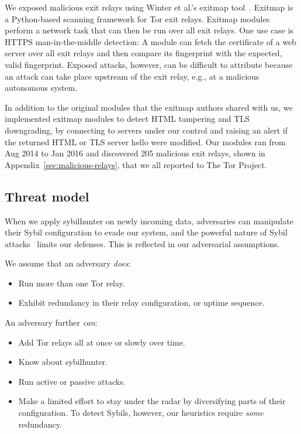 We exposed malicious exit relays using Winter et al.'s exitmap tool~\cite[\S
3.1]{Winter2014a}.  Exitmap is a Python-based scanning framework for Tor exit
relays.  Exitmap modules perform a network task that can then be run over all
exit relays.  One use case is HTTPS man-in-the-middle detection: A module can
fetch the certificate of a web server over all exit relays and then compare its
fingerprint with the expected, valid fingerprint.  Exposed attacks, however, can
be difficult to attribute because an attack can take place upstream of the exit
relay, e.g., at a malicious autonomous system.

In addition to the original modules that the exitmap authors shared with us, we
implemented exitmap modules to detect HTML tampering and TLS downgrading, by
connecting to servers under our control and raising an alert if the returned
HTML or TLS server hello were modified.  Our modules ran from Aug 2014 to Jan
2016 and discovered 205 malicious exit relays, shown in
Appendix~\ref{sec:malicious-relays}, that we all reported to The Tor Project.

\subsection{Threat model}
\label{sec:threat_model}
When we apply sybilhunter on newly incoming data, adversaries can manipulate
their Sybil configuration to evade our system, and the powerful nature of Sybil
attacks~\cite{Douceur2002a} limits our defenses.  This is reflected in our
adversarial assumptions.

We assume that an adversary \emph{does}:
\begin{itemize}
	\item Run more than one Tor relay.

	\item Exhibit redundancy in their relay configuration, or uptime sequence.
\end{itemize}

An adversary further \emph{can}:
\begin{itemize}
	\item Add Tor relays all at once or slowly over time.

	\item Know about sybilhunter.

	\item Run active or passive attacks.

	\item Make a limited effort to stay under the radar by diversifying parts of
		their configuration.  To detect Sybils, however, our heuristics require
		\emph{some} redundancy.
\end{itemize}

